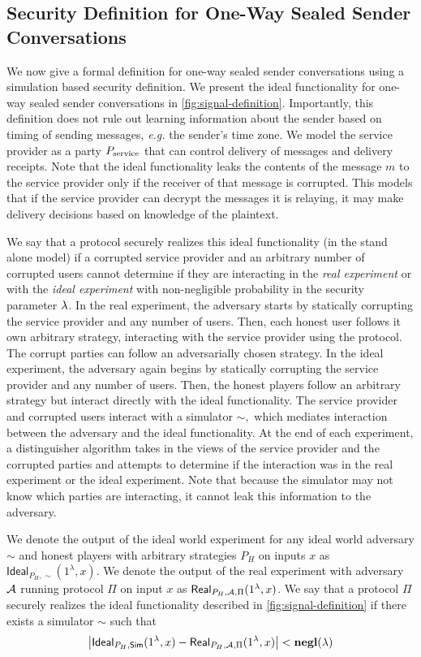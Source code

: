 
\subsection{Security Definition for One-Way Sealed Sender Conversations}\label{sec:signal-apxdefinitions}

We now give a formal definition for one-way sealed sender conversations using a simulation based security definition.  We present the ideal functionality for one-way sealed sender conversations in \cref{fig:signal-definition}.  Importantly, this definition does not rule out learning information about the sender based on timing of sending messages, {\em e.g.} the sender's time zone.  We model the service provider as a party $P_{\text{service}}$ that can control delivery of messages and delivery receipts.  Note that the ideal functionality leaks the contents of the message $m$ to the service provider only if the receiver of that message is corrupted.  This models that if the service provider can decrypt the messages it is relaying, it may make delivery decisions based on knowledge of the plaintext.

We say that a protocol securely realizes this ideal functionality (in the stand alone model) if a corrupted service provider and an arbitrary number of corrupted users cannot determine if they are interacting in the {\em real experiment} or with the {\em ideal experiment} with non-negligible probability in the security parameter $\lambda$.  In the real experiment, the adversary starts by statically corrupting the service provider and any number of users.  Then, each honest user follows it own arbitrary strategy, interacting with the service provider using the protocol.  The corrupt parties can follow an adversarially chosen strategy.  In the ideal experiment, the adversary again begins by statically corrupting the service provider and any number of users.  Then, the honest players follow an arbitrary strategy but interact directly with the ideal functionality.  The service provider and corrupted users interact with a simulator $\sim,$ which mediates interaction between the adversary and the ideal functionality.  At the end of each experiment, a distinguisher algorithm takes in the views of the service provider and the corrupted parties and attempts to determine if the interaction was in the real experiment or the ideal experiment.  Note that because the simulator may not know which parties are interacting, it cannot leak this information to the adversary.

We denote the output of the ideal world experiment for any ideal world adversary $\sim$ and honest players with arbitrary strategies $P_H$ on inputs $x$ as $\mathsf{Ideal}_{P_H,\sim}(1^\lambda, x).$  We denote the output of the real experiment with adversary $\mathcal{A}$ running protocol $\Pi$ on input $x$ as $\mathsf{Real}_{P_H,\mathcal{A},\Pi}(1^\lambda, x)$.  We say that a protocol $\Pi$ securely realizes the ideal functionality described in \cref{fig:signal-definition} if there exists a simulator $\sim$ such that 
$$\left|\mathsf{Ideal}_{P_H,\mathsf{Sim}}(1^\lambda, x) - \mathsf{Real}_{P_H,\mathcal{A},\Pi}(1^\lambda, x)\right| < \mathsf{{\bf negl}}(\lambda)$$
